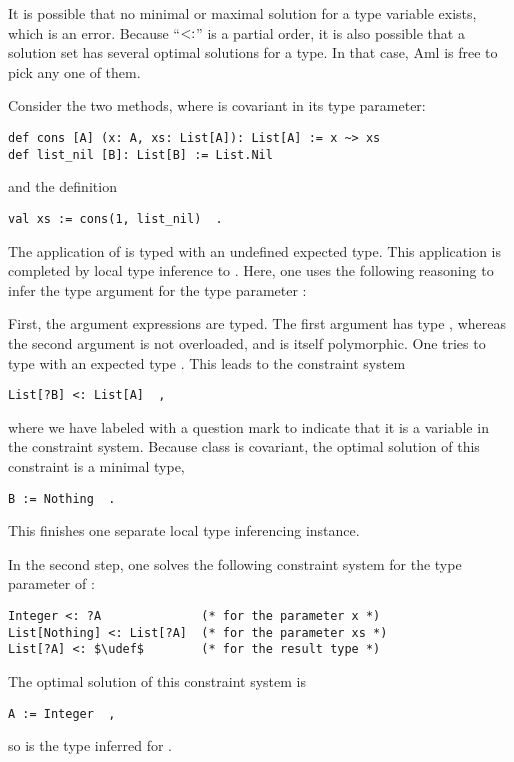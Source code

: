 It is possible that no minimal or maximal solution for a type variable exists, which is an error. Because ``$<:$'' is a partial order, it is also possible that a solution set has several optimal solutions for a type. In that case, Aml is free to pick any one of them. 

\example Consider the two methods, where  is covariant in its type parameter:
\begin{lstlisting}
def cons [A] (x: A, xs: List[A]): List[A] := x ~> xs
def list_nil [B]: List[B] := List.Nil
\end{lstlisting}
and the definition
\begin{lstlisting}
val xs := cons(1, list_nil)  .
\end{lstlisting}

The application of  is typed with an undefined expected type. This application is completed by local type inference to . Here, one uses the following reasoning to infer the type argument  for the type parameter :

First, the argument expressions are typed. The first argument  has type , whereas the second argument  is not overloaded, and is itself polymorphic. One tries to type  with an expected type . This leads to the constraint system
\begin{lstlisting}
List[?B] <: List[A]  ,
\end{lstlisting}
where we have labeled  with a question mark to indicate that it is a variable in the constraint system. Because class  is covariant, the optimal solution of this constraint is a minimal type, 
\begin{lstlisting}
B := Nothing  .
\end{lstlisting}

This finishes one separate local type inferencing instance. 

In the second step, one solves the following constraint system for the type parameter  of :
\begin{lstlisting}
Integer <: ?A              (* for the parameter x *)
List[Nothing] <: List[?A]  (* for the parameter xs *)
List[?A] <: $\udef$        (* for the result type *)
\end{lstlisting}

The optimal solution of this constraint system is 
\begin{lstlisting}
A := Integer  ,
\end{lstlisting}
so  is the type inferred for . 

